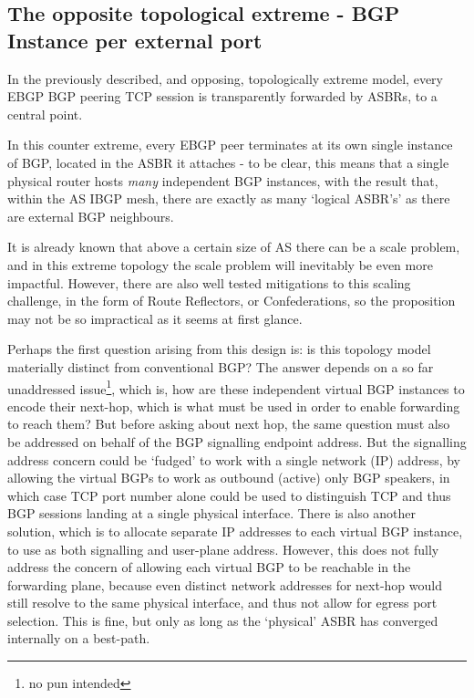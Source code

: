 \subsection{The opposite topological extreme - BGP Instance per external port}

In the previously described, and opposing, topologically extreme model, every EBGP BGP peering TCP session is transparently forwarded by ASBRs, to a central point.

In this counter extreme, every EBGP peer terminates at its own single instance of BGP, located in the ASBR it attaches - to be clear, this means that a single physical router hosts \textit{many} independent BGP instances, with the result that, within the AS IBGP mesh, there are exactly as many `logical ASBR's' as there are external BGP neighbours.

It is already known that above a certain size of AS there can be a scale problem, and in this extreme topology the scale problem will inevitably be even more impactful.  However, there are also well tested  mitigations to this scaling challenge, in the form of Route Reflectors, or Confederations, so the proposition may not be so impractical as it seems at first glance.

Perhaps the first question arising from this design is:  is this topology model materially distinct from  conventional BGP?  The answer depends on a so far unaddressed issue\footnote{no pun intended}, which is, how are these independent virtual BGP instances to encode their next-hop, which is what must be used in order to enable forwarding to reach them?  But before asking about next hop, the same question must also be addressed on behalf of the BGP signalling endpoint address.  But the signalling address concern could be `fudged' to work with a single network (IP) address, by allowing the virtual BGPs to work as outbound (active) only BGP speakers, in which case TCP port number alone could be used to distinguish TCP and thus BGP sessions landing at a single physical interface.  There is also another solution, which is to allocate separate IP addresses to each virtual BGP instance, to use as both signalling and user-plane address.  However, this does not fully address the concern of allowing each virtual BGP to be reachable in the forwarding plane, because even distinct network addresses for next-hop would still resolve to the same physical interface, and thus not allow for egress port selection.  This is fine, but only as long as the `physical' ASBR has converged internally on a best-path.

